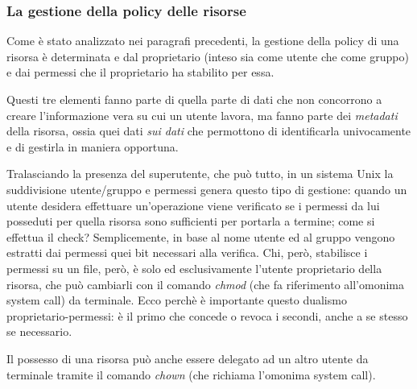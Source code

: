 \newpage

\subsubsection{La gestione della policy delle risorse}
Come è stato analizzato nei paragrafi precedenti, la gestione della policy di una risorsa è determinata e dal proprietario (inteso sia come utente che come gruppo) e dai permessi che il proprietario ha stabilito per essa.

Questi tre elementi fanno parte di quella parte di dati che non concorrono a creare l'informazione vera su cui un utente lavora, ma fanno parte dei \emph{metadati} della risorsa, ossia quei dati \emph{sui dati} che permottono di identificarla univocamente e di gestirla in maniera opportuna. 

Tralasciando la presenza del superutente, che può tutto, in un sistema Unix la suddivisione utente/gruppo e permessi genera questo tipo di gestione: quando un utente desidera effettuare un'operazione viene verificato se i permessi da lui posseduti per quella risorsa sono sufficienti per portarla a termine; come si effettua il check? Semplicemente, in base al nome utente ed al gruppo vengono estratti dai permessi quei bit necessari alla verifica. Chi, però, stabilisce i permessi su un file, però, è solo ed esclusivamente l'utente proprietario della risorsa, che può cambiarli con il comando \emph{chmod} (che fa riferimento all'omonima system call) da terminale. Ecco perchè è importante questo dualismo proprietario-permessi: è il primo che concede o revoca i secondi, anche a se stesso se necessario. 

Il possesso di una risorsa può anche essere delegato ad un altro utente da terminale tramite il comando \emph{chown} (che richiama l'omonima system call).

